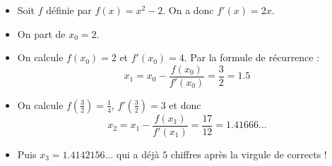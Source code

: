 \documentclass[11pt,class=report,crop=false]{standalone}
\begin{document}
\begin{cours}
\begin{exemple}
\begin{itemize}
  \item Soit $f$ définie par $f(x)=x^2-2$. On a donc $f'(x) = 2x$.
  
  \item On part de $x_0=2$.
  
  \item On calcule $f(x_0) = 2$ et $f'(x_0) = 4$. Par la formule de récurrence :
  $$x_1 = x_0 - \frac{f(x_0)}{f'(x_0)} = \frac32 = 1.5$$
  
  \item On calcule $f(\frac32) = \frac14$, $f'(\frac32)=3$ et donc
  $$x_2 = x_1 - \frac{f(x_1)}{f'(x_1)} = \frac{17}{12} = 1.41666\ldots$$ 
  
  \item Puis $x_3 = 1.4142156\ldots$ qui a déjà $5$ chiffres après la virgule de corrects !
\end{itemize}

\end{exemple}

\end{cours}
\end{document}
